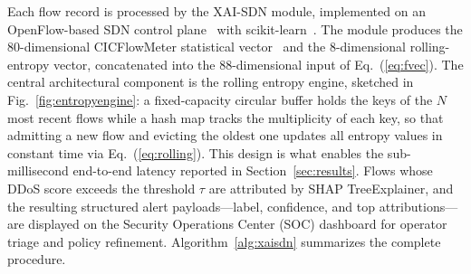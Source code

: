 ﻿\documentclass[review,12pt]{elsarticle}
\begin{document}
Each flow record is processed by the XAI-SDN module, implemented on an OpenFlow-based SDN control plane~\cite{mckeown2008openflow} with scikit-learn~\cite{pedregosa2011sklearn}. The module produces the 80-dimensional CICFlowMeter statistical vector~\cite{sharafaldin2018cicids} and the 8-dimensional rolling-entropy vector, concatenated into the 88-dimensional input of Eq.~(\ref{eq:fvec}). The central architectural component is the rolling entropy engine, sketched in Fig.~\ref{fig:entropyengine}: a fixed-capacity circular buffer holds the keys of the $N$ most recent flows while a hash map tracks the multiplicity of each key, so that admitting a new flow and evicting the oldest one updates all entropy values in constant time via Eq.~(\ref{eq:rolling}). This design is what enables the sub-millisecond end-to-end latency reported in Section~\ref{sec:results}. Flows whose DDoS score exceeds the threshold $\tau$ are attributed by SHAP TreeExplainer, and the resulting structured alert payloads---label, confidence, and top attributions---are displayed on the Security Operations Center (SOC) dashboard for operator triage and policy refinement. Algorithm~\ref{alg:xaisdn} summarizes the complete procedure.
\end{document}
